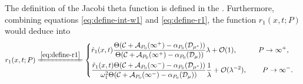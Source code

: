 \documentclass[11pt,reqno]{amsart}
\numberwithin{equation}{section}
\begin{document}
The definition of the Jacobi theta function is defined in the . 
Furthermore, combining equations \eqref{eq:define-int-w1} and \eqref{eq:define-r1}, the function $r_1(x,t;P)$ would deduce into 
\begin{equation}\label{eq:r12-P-pm-infty}
	\begin{split}
		&r_1(x,t;P)
		\xlongequal{\eqref{eq:define-r1}}\left\{
	\begin{aligned}
		&\hat{r}_1(x,t)\frac{\Theta(\mathcal{C}+\mathcal{A}_{P_0}(\infty^{+})-\alpha_{P_0}(\mathcal{D}_{\mu^*}))}{\Theta(\mathcal{C}+\mathcal{A}_{P_0}(\infty^{+})-\alpha_{P_0}(\mathcal{D}_{\mu}))}\lambda+\mathcal{O}(1),
		\qquad \quad 	P\rightarrow \infty^{+},\\
		&\frac{\hat{r}_1(x,t)\Theta(\mathcal{C}+\mathcal{A}_{P_0}(\infty^{-})-\alpha_{P_0}(\mathcal{D}_{\mu^*}))}{\omega_1^2\Theta(\mathcal{C}+\mathcal{A}_{P_0}(\infty^{-})-\alpha_{P_0}(\mathcal{D}_{\mu}))}\frac{1}{\lambda }+\mathcal{O}(\lambda^{-2}),\qquad  \,
	 	P\rightarrow \infty^{-}.
	\end{aligned}\right.
	\end{split}	
\end{equation}
\end{document}
